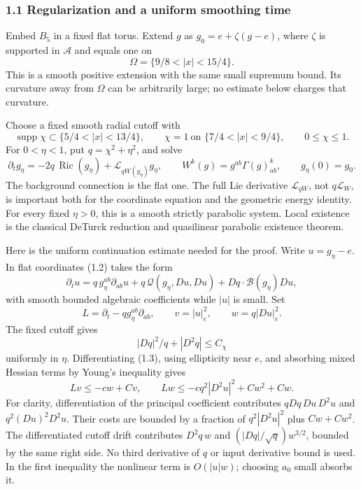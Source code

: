 \documentclass[
  11pt,
]{article}
\begin{document}
\hypertarget{regularization-and-a-uniform-smoothing-time}{%
\subsubsection{1.1 Regularization and a uniform smoothing
time}\label{regularization-and-a-uniform-smoothing-time}}

Embed \(B_5\) in a fixed flat torus. Extend \(g\) as
\(g_0=e+\zeta(g-e)\), where \(\zeta\) is supported in \(\mathcal A\) and
equals one on \[
 \Omega=\{9/8<|x|<15/4\}.
\] This is a smooth positive extension with the same small supremum
bound. Its curvature away from \(\Omega\) can be arbitrarily large; no
estimate below charges that curvature.

Choose a fixed smooth radial cutoff with \[
 \operatorname{supp}\chi\subset\{5/4<|x|<13/4\},\qquad
 \chi=1\ \text{on }\{7/4<|x|<9/4\},\qquad 0\le\chi\le1 .
\] For \(0<\eta<1\), put \(q=\chi^2+\eta^2\), and solve \[
 \partial_tg_\eta=-2q\,\operatorname{Ric}(g_\eta)
                    +\mathcal L_{qW(g_\eta)}g_\eta,\qquad
 W^k(g)=g^{ab}\Gamma(g)^k_{ab},\qquad g_\eta(0)=g_0.   \tag{1.2}
\] The background connection is the flat one. The full Lie derivative
\(\mathcal L_{qW}\), not \(q\mathcal L_W\), is important both for the
coordinate equation and the geometric energy identity. For every fixed
\(\eta>0\), this is a smooth strictly parabolic system. Local existence
is the classical DeTurck reduction and quasilinear parabolic existence
theorem.

Here is the uniform continuation estimate needed for the proof. Write
\(u=g_\eta-e\). In flat coordinates (1.2) takes the form \[
 \partial_tu=q\,g_\eta^{ab}\partial_{ab}u
             +q\,\mathcal Q(g_\eta,Du,Du)
             +Dq\cdot\mathcal B(g_\eta)Du,              \tag{1.3}
\] with smooth bounded algebraic coefficients while \(|u|\) is small.
Set \[
 L=\partial_t-qg_\eta^{ab}\partial_{ab},\qquad
 v=|u|_e^2,\qquad w=q|Du|_e^2 .
\] The fixed cutoff gives \[
 |Dq|^2/q+|D^2q|\le C_\chi
\] uniformly in \(\eta\). Differentiating (1.3), using ellipticity near
\(e\), and absorbing mixed Hessian terms by Young's inequality gives \[
 Lv\le-cw+Cv,\qquad
 Lw\le-cq^2|D^2u|^2+Cw^2+Cw.                         \tag{1.4}
\] For clarity, differentiation of the principal coefficient contributes
\(qDq\,Du\,D^2u\) and \(q^2(Du)^2D^2u\). Their costs are bounded by a
fraction of \(q^2|D^2u|^2\) plus \(Cw+Cw^2\). The differentiated cutoff
drift contributes \(D^2q\,w\) and \((|Dq|/\sqrt q)w^{3/2}\), bounded by
the same right side. No third derivative of \(q\) or input derivative
bound is used. In the first inequality the nonlinear term is
\(O(|u|w)\); choosing \(a_0\) small absorbs it.
\end{document}

